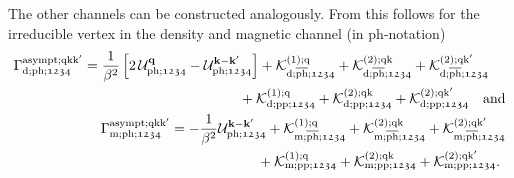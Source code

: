 \documentclass[../../main.tex]{subfiles}
\begin{document}
The other channels can be constructed analogously. From this follows for the irreducible vertex in the density and magnetic channel (in ph-notation)
\begin{subequations}
\begin{align}
\begin{split}
	\Gamma^{\text{asympt};\text{q}\text{k}\text{k}'}_{\text{d};\text{ph};\mathfrak{1234}}&=\frac{1}{\beta^2}\left [2\,\mathcal{U}^{\textbf{q}}_{\text{ph};\mathfrak{1234}} - \mathcal{U}^{\textbf{k}-\textbf{k}'}_{\text{ph};\mathfrak{1234}}\right ] + \mathcal{K}^{(1);\text{q}}_{\text{d};\overline{\text{ph}};\mathfrak{1234}} + \mathcal{K}^{(2);\text{q}\text{k}}_{\text{d};\overline{\text{ph}};\mathfrak{1234}}+\mathcal{K}^{(2);\text{q}\text{k}'}_{\text{d};\overline{\text{ph}};\mathfrak{1234}}\\
	&\qquad\qquad\qquad\qquad\qquad\quad\,+\mathcal{K}^{(1);\text{q}}_{\text{d};\text{pp};\mathfrak{1234}} + \mathcal{K}^{(2);\text{q}\text{k}}_{\text{d};\text{pp};\mathfrak{1234}}+\mathcal{K}^{(2);\text{q}\text{k}'}_{\text{d};\text{pp};\mathfrak{1234}} \quad\text{and}
\end{split}\\
\begin{split}
	\Gamma^{\text{asympt};\text{q}\text{k}\text{k}'}_{\text{m};\text{ph};\mathfrak{1234}}&=-\frac{1}{\beta^2}\mathcal{U}^{\textbf{k}-\textbf{k}'}_{\text{ph};\mathfrak{1234}} + \mathcal{K}^{(1);\text{q}}_{\text{m};\overline{\text{ph}};\mathfrak{1234}} + \mathcal{K}^{(2);\text{q}\text{k}}_{\text{m};\overline{\text{ph}};\mathfrak{1234}}+\mathcal{K}^{(2);\text{q}\text{k}'}_{\text{m};\overline{\text{ph}};\mathfrak{1234}}\\
	&\qquad\qquad\qquad\:+\mathcal{K}^{(1);\text{q}}_{\text{m};\text{pp};\mathfrak{1234}} + \mathcal{K}^{(2);\text{q}\text{k}}_{\text{m};\text{pp};\mathfrak{1234}}+\mathcal{K}^{(2);\text{q}\text{k}'}_{\text{m};\text{pp};\mathfrak{1234}}.
\end{split}
\end{align}
\end{subequations}
\end{document}
